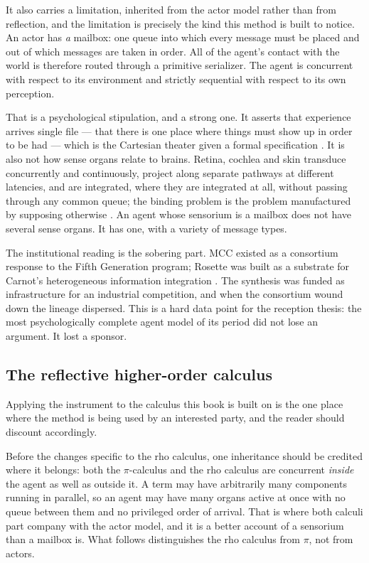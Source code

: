 It also carries a limitation, inherited from the actor model rather
than from reflection, and the limitation is precisely the kind this
method is built to notice.
An actor has \emph{a} mailbox: one queue into which every message
must be placed and out of which messages are taken in order.
All of the agent's contact with the world is therefore routed
through a primitive serializer.
The agent is concurrent with respect to its environment and strictly
sequential with respect to its own perception.

That is a psychological stipulation, and a strong one.
It asserts that experience arrives single file --- that there is one
place where things must show up in order to be had --- which is the
Cartesian theater given a formal specification \cite{dennett1991}.
It is also not how sense organs relate to brains.
Retina, cochlea and skin transduce concurrently and continuously,
project along separate pathways at different latencies, and are
integrated, where they are integrated at all, without passing
through any common queue; the binding problem is the problem
manufactured by supposing otherwise
\cite{treisman1980,malsburg1981}.
An agent whose sensorium is a mailbox does not have several sense
organs.
It has one, with a variety of message types.

The institutional reading is the sobering part.
MCC existed as a consortium response to the Fifth Generation
program; Rosette was built as a substrate for Carnot's heterogeneous
information integration \cite{carnot1993}.
The synthesis was funded as infrastructure for an industrial
competition, and when the consortium wound down the lineage
dispersed.
This is a hard data point for the reception thesis: the most
psychologically complete agent model of its period did not lose an
argument.
It lost a sponsor.

\subsection{The reflective higher-order calculus}
\label{psy:sec:rho}

Applying the instrument to the calculus this book is built on is the
one place where the method is being used by an interested party, and
the reader should discount accordingly.

Before the changes specific to the rho calculus, one inheritance
should be credited where it belongs: both the $\pi$-calculus and the
rho calculus are concurrent \emph{inside} the agent as well as
outside it.
A term may have arbitrarily many components running in parallel, so
an agent may have many organs active at once with no queue between
them and no privileged order of arrival.
That is where both calculi part company with the actor model, and it
is a better account of a sensorium than a mailbox is.
What follows distinguishes the rho calculus from $\pi$, not from
actors.

